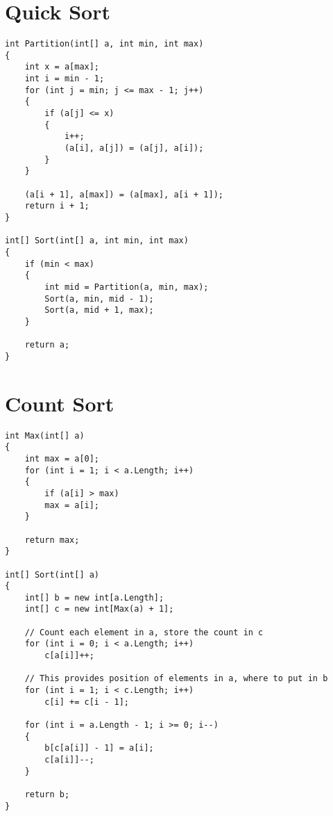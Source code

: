 \documentclass[a4paper,12pt]{article}
\begin{document}
	\section{Quick Sort}
	\begin{verbatim}
int Partition(int[] a, int min, int max)
{
	int x = a[max];
	int i = min - 1;
	for (int j = min; j <= max - 1; j++)
	{
		if (a[j] <= x)
		{
			i++;
			(a[i], a[j]) = (a[j], a[i]);
		}
	}
	
	(a[i + 1], a[max]) = (a[max], a[i + 1]);
	return i + 1;
}

int[] Sort(int[] a, int min, int max)
{
	if (min < max)
	{
		int mid = Partition(a, min, max);
		Sort(a, min, mid - 1);
		Sort(a, mid + 1, max);
	}
	
	return a;
}
	\end{verbatim}
	
	\section{Count Sort}
	\begin{verbatim}
int Max(int[] a)
{
	int max = a[0];
	for (int i = 1; i < a.Length; i++)
	{
		if (a[i] > max)
		max = a[i];
	}
	
	return max;
}

int[] Sort(int[] a)
{
	int[] b = new int[a.Length];
	int[] c = new int[Max(a) + 1];
	
	// Count each element in a, store the count in c
	for (int i = 0; i < a.Length; i++)
		c[a[i]]++;
	
	// This provides position of elements in a, where to put in b
	for (int i = 1; i < c.Length; i++)
		c[i] += c[i - 1];
	
	for (int i = a.Length - 1; i >= 0; i--)
	{
		b[c[a[i]] - 1] = a[i];
		c[a[i]]--;
	}
	
	return b;
}
	\end{verbatim}
	
\end{document}
